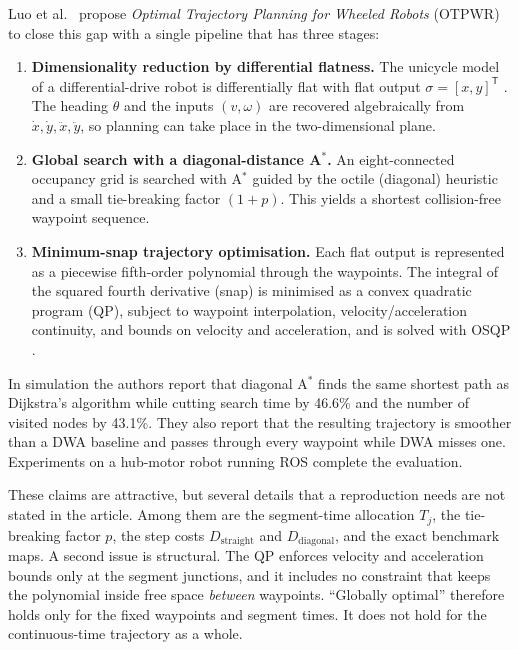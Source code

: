 \documentclass[11pt,a4paper]{article}
\begin{document}
Luo et al.\ \citep{luo2024otpwr} propose \emph{Optimal Trajectory Planning for
Wheeled Robots} (OTPWR) to close this gap with a single pipeline that has
three stages:
\begin{enumerate}[label=(\roman*),nosep]
  \item \textbf{Dimensionality reduction by differential flatness.} The
        unicycle model of a differential-drive robot is differentially flat
        with flat output $\sigma=[x,y]^{\mathsf T}$
        \citep{fliess1995flatness,murray1995flat}. The heading $\theta$ and
        the inputs $(v,\omega)$ are recovered algebraically from
        $\dot x,\dot y,\ddot x,\ddot y$, so planning can take place in the
        two-dimensional plane.
  \item \textbf{Global search with a diagonal-distance A$^\ast$.} An
        eight-connected occupancy grid is searched with A$^\ast$ guided by
        the octile (diagonal) heuristic and a small tie-breaking factor
        $(1+p)$. This yields a shortest collision-free waypoint sequence.
  \item \textbf{Minimum-snap trajectory optimisation.} Each flat output is
        represented as a piecewise fifth-order polynomial through the
        waypoints. The integral of the squared fourth derivative (snap) is
        minimised as a convex quadratic program (QP), subject to waypoint
        interpolation, velocity/acceleration continuity, and bounds on
        velocity and acceleration, and is solved with OSQP
        \citep{stellato2020osqp}.
\end{enumerate}
In simulation the authors report that diagonal A$^\ast$ finds the same
shortest path as Dijkstra's algorithm while cutting search time by 46.6\%
and the number of visited nodes by 43.1\%. They also report that the
resulting trajectory is smoother than a DWA baseline and passes through every
waypoint while DWA misses one. Experiments on a hub-motor robot running ROS
complete the evaluation.

These claims are attractive, but several details that a reproduction needs
are not stated in the article. Among them are the segment-time allocation
$T_j$, the tie-breaking factor $p$, the step costs $D_{\mathrm{straight}}$ and
$D_{\mathrm{diagonal}}$, and the exact benchmark maps. A second issue is
structural. The QP enforces velocity and acceleration bounds only at the
segment junctions, and it includes no constraint that keeps the polynomial
inside free space \emph{between} waypoints. ``Globally optimal'' therefore
holds only for the fixed waypoints and segment times. It does not hold for
the continuous-time trajectory as a whole.
\end{document}
